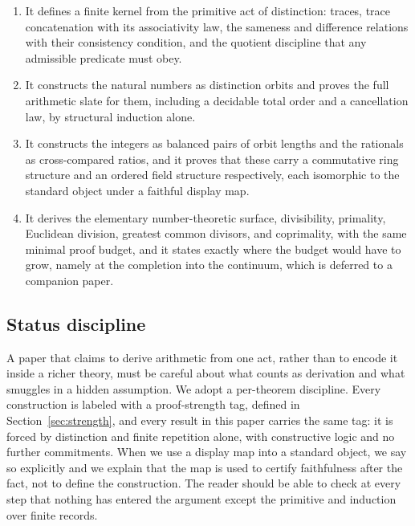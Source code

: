 \documentclass[11pt,a4paper]{article}
\theoremstyle{definition}
\theoremstyle{remark}
\begin{document}
\begin{enumerate}[leftmargin=2em]
  \item It defines a finite kernel from the primitive act of distinction:
    traces, trace concatenation with its associativity law, the sameness and
    difference relations with their consistency condition, and the quotient
    discipline that any admissible predicate must obey.
  \item It constructs the natural numbers as distinction orbits and proves the
    full arithmetic slate for them, including a decidable total order and a
    cancellation law, by structural induction alone.
  \item It constructs the integers as balanced pairs of orbit lengths and the
    rationals as cross-compared ratios, and it proves that these carry a
    commutative ring structure and an ordered field structure respectively,
    each isomorphic to the standard object under a faithful display map.
  \item It derives the elementary number-theoretic surface, divisibility,
    primality, Euclidean division, greatest common divisors, and coprimality,
    with the same minimal proof budget, and it states exactly where the budget
    would have to grow, namely at the completion into the continuum, which is
    deferred to a companion paper.
\end{enumerate}

\subsection{Status discipline}

A paper that claims to derive arithmetic from one act, rather than to encode it
inside a richer theory, must be careful about what counts as derivation and what
smuggles in a hidden assumption. We adopt a per-theorem discipline. Every
construction is labeled with a proof-strength tag, defined in
Section~\ref{sec:strength}, and every result in this paper carries the same tag:
it is forced by distinction and finite repetition alone, with constructive logic
and no further commitments. When we use a display map into a standard object, we
say so explicitly and we explain that the map is used to certify faithfulness
after the fact, not to define the construction. The reader should be able to
check at every step that nothing has entered the argument except the primitive
and induction over finite records.

\end{document}
